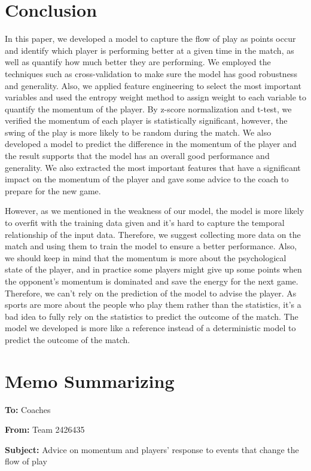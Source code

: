 \documentclass[12pt]{article}
\begin{document}
\section{Conclusion}
\quad In this paper, we developed a model to capture the flow of play as points occur and identify which player is performing better at a given time in the match, as well as quantify how much better they are 
performing. We employed the techniques such as cross-validation to make sure the model has good robustness and generality. Also, we applied feature engineering to select the most important variables and used the entropy weight method to
assign weight to each variable to quantify the momentum of the player. By z-score normalization and t-test, we verified the momentum of each player is statistically significant, however, the swing of the play is more likely to be random during
the match. We also developed a model to predict the difference in the momentum of the player and the result supports that the model has an overall good performance and generality. We also extracted the most important features that have a significant 
impact on the momentum of the player and gave some advice to the coach to prepare for the new game. 

However, as we mentioned in the weakness of our model, the model is more likely to overfit with the training data given and it's hard to capture the temporal 
relationship of the input data. Therefore, we suggest collecting more data on the match and using them to train the model to ensure a better performance. Also, we should keep in mind that the momentum is more about the psychological state of the player, 
and in practice some players might give up some points when the opponent's momentum is dominated and save the energy for the next game. Therefore, we can't rely on the prediction of the model to advise the player. As sports are 
more about the people who play them rather than the statistics, it's a bad idea to fully rely on the statistics to predict the outcome of the match. The model we developed is more like a reference instead of a deterministic model to predict the outcome of the match.


\section{Memo Summarizing}

\textbf{To:} Coaches

\noindent\textbf{From:} Team 2426435

\noindent\textbf{Subject:} Advice on momentum and players' response to events that change the flow of play
\end{document}
